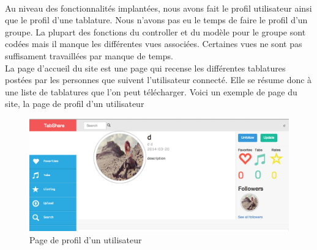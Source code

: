 \paragraph{}
Au niveau des fonctionnalités implantées, nous avons fait le profil utilisateur ainsi que le profil d'une tablature. Nous n'avons pas eu le temps de faire le profil d'un groupe. La plupart des fonctions du controller et du modèle pour le groupe sont codées mais il manque les différentes vues associées. Certaines vues ne sont pas suffisament travaillées par manque de temps. \\
La page d'accueil du site est une page qui recense les différentes tablatures postées par les personnes que suivent l'utilisateur connecté.
Elle se résume donc à une liste de tablatures que l'on peut télécharger.
Voici un exemple de page du site, la page de profil d'un utilisateur

\begin{figure}[H]
\centering
\includegraphics[scale=0.3]{profilUserWeb}
\caption{Page de profil d'un utilisateur}
\end{figure}

